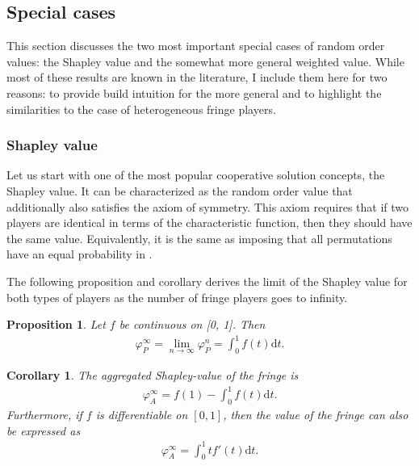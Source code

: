 \documentclass[a4paper]{article}
\newtheorem{proposition}{Proposition}
\newtheorem{corollary}{Corollary}
\newcommand{\dt}{\mathrm{d}t}
\begin{document}
\subsection{Special cases}

This section discusses the two most important special cases of random order values: the Shapley value and the somewhat more general weighted value.
While most of these results are known in the literature, I include them here for two reasons: to provide build intuition for the more general and to highlight the similarities to the case of heterogeneous fringe players.

\subsubsection{Shapley value}

Let us start with one of the most popular cooperative solution concepts, the Shapley value.
It can be characterized as the random order value that additionally also satisfies the axiom of symmetry.
This axiom requires that if two players are identical in terms of the characteristic function, then they should have the same value.
Equivalently, it is the same as imposing that all permutations have an equal probability in .

The following proposition and corollary derives the limit of the Shapley value for both types of players as the number of fringe players goes to infinity.

\begin{proposition}
    \label{prop:one_sided}
    Let $f$ be continuous on [0, 1]. Then
    \begin{align*}
        \varphi_P^\infty = \lim_{n \to \infty} \varphi_P^n = \int_0^1 f(t) \dt .
    \end{align*}
\end{proposition}

\begin{corollary}
    \label{cor:fringe_value}
    The aggregated Shapley-value of the fringe is
    \begin{align*}
        \varphi_A^\infty = f(1) - \int_0^1 f(t) \dt.
    \end{align*}
    Furthermore, if $f$ is differentiable on $[0, 1]$, then the value of the fringe can also be expressed as
    \begin{align*}
        \varphi_A^\infty = \int_0^1 t f'(t) \dt.
    \end{align*}
\end{corollary}
\end{document}
